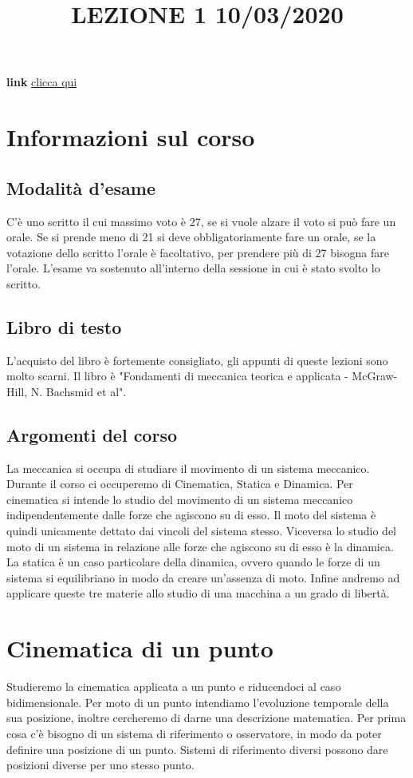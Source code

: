 \title{LEZIONE 1 10/03/2020}\newline
\textbf{link} \href{https://web.microsoftstream.com/video/58e86b29-c2c0-47d6-bbb4-f54861155460}{clicca qui}
\section{Informazioni sul corso}
\subsection{Modalità d'esame}
C'è uno scritto il cui massimo voto è 27, se si vuole alzare il voto si può fare un orale. Se si prende meno di 21 si deve obbligatoriamente fare un orale, se la votazione dello scritto l'orale è facoltativo, per prendere più di 27 bisogna fare l'orale. L'esame va sostenuto all'interno della sessione in cui è stato svolto lo scritto.
\subsection{Libro di testo}
L'acquisto del libro è fortemente consigliato, gli appunti di queste lezioni sono molto scarni. Il libro è "Fondamenti di meccanica teorica e applicata - McGraw-Hill, N. Bachsmid et al".
\subsection{Argomenti del corso}
La meccanica si occupa di studiare il movimento di un sistema meccanico. Durante il corso ci occuperemo di Cinematica, Statica e Dinamica.\newline
Per cinematica si intende lo studio del movimento di un sistema meccanico indipendentemente dalle forze che agiscono su di esso. Il moto del sistema è quindi unicamente dettato dai vincoli del sistema stesso.\newline
Viceversa lo studio del moto di un sistema in relazione alle forze che agiscono su di esso è la dinamica.\newline
La statica è un caso particolare della dinamica, ovvero quando le forze di un sistema si equilibriano in modo da creare un'assenza di moto.\newline
Infine andremo ad applicare queste tre materie allo studio di una macchina a un grado di libertà.\newline
\section{Cinematica di un punto}
Studieremo la cinematica applicata a un punto e riducendoci al caso bidimensionale.\newline
Per moto di un punto intendiamo l'evoluzione temporale della sua posizione, inoltre cercheremo di darne una descrizione matematica.\newline
Per prima cosa c'è bisogno di un sistema di riferimento o osservatore, in modo da poter definire una posizione di un punto. Sistemi di riferimento diversi possono dare posizioni diverse per uno stesso punto.\newline
